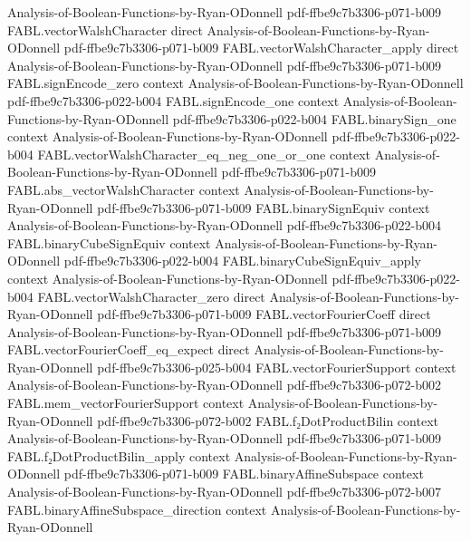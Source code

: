 \begin{theorem}
  {Analysis-of-Boolean-Functions-by-Ryan-ODonnell}
  {pdf-ffbe9c7b3306-p071-b009}
\proofstep
  {FABL.vectorWalshCharacter}
  {direct}
  {Analysis-of-Boolean-Functions-by-Ryan-ODonnell}
  {pdf-ffbe9c7b3306-p071-b009}
\proofstep
  {FABL.vectorWalshCharacter_apply}
  {direct}
  {Analysis-of-Boolean-Functions-by-Ryan-ODonnell}
  {pdf-ffbe9c7b3306-p071-b009}
\proofstep
  {FABL.signEncode_zero}
  {context}
  {Analysis-of-Boolean-Functions-by-Ryan-ODonnell}
  {pdf-ffbe9c7b3306-p022-b004}
\proofstep
  {FABL.signEncode_one}
  {context}
  {Analysis-of-Boolean-Functions-by-Ryan-ODonnell}
  {pdf-ffbe9c7b3306-p022-b004}
\proofstep
  {FABL.binarySign_one}
  {context}
  {Analysis-of-Boolean-Functions-by-Ryan-ODonnell}
  {pdf-ffbe9c7b3306-p022-b004}
\proofstep
  {FABL.vectorWalshCharacter_eq_neg_one_or_one}
  {context}
  {Analysis-of-Boolean-Functions-by-Ryan-ODonnell}
  {pdf-ffbe9c7b3306-p071-b009}
\proofstep
  {FABL.abs_vectorWalshCharacter}
  {context}
  {Analysis-of-Boolean-Functions-by-Ryan-ODonnell}
  {pdf-ffbe9c7b3306-p071-b009}
\proofstep
  {FABL.binarySignEquiv}
  {context}
  {Analysis-of-Boolean-Functions-by-Ryan-ODonnell}
  {pdf-ffbe9c7b3306-p022-b004}
\proofstep
  {FABL.binaryCubeSignEquiv}
  {context}
  {Analysis-of-Boolean-Functions-by-Ryan-ODonnell}
  {pdf-ffbe9c7b3306-p022-b004}
\proofstep
  {FABL.binaryCubeSignEquiv_apply}
  {context}
  {Analysis-of-Boolean-Functions-by-Ryan-ODonnell}
  {pdf-ffbe9c7b3306-p022-b004}
\proofstep
  {FABL.vectorWalshCharacter_zero}
  {direct}
  {Analysis-of-Boolean-Functions-by-Ryan-ODonnell}
  {pdf-ffbe9c7b3306-p071-b009}
\proofstep
  {FABL.vectorFourierCoeff}
  {direct}
  {Analysis-of-Boolean-Functions-by-Ryan-ODonnell}
  {pdf-ffbe9c7b3306-p071-b009}
\proofstep
  {FABL.vectorFourierCoeff_eq_expect}
  {direct}
  {Analysis-of-Boolean-Functions-by-Ryan-ODonnell}
  {pdf-ffbe9c7b3306-p025-b004}
\proofstep
  {FABL.vectorFourierSupport}
  {context}
  {Analysis-of-Boolean-Functions-by-Ryan-ODonnell}
  {pdf-ffbe9c7b3306-p072-b002}
\proofstep
  {FABL.mem_vectorFourierSupport}
  {context}
  {Analysis-of-Boolean-Functions-by-Ryan-ODonnell}
  {pdf-ffbe9c7b3306-p072-b002}
\proofstep
  {FABL.f₂DotProductBilin}
  {context}
  {Analysis-of-Boolean-Functions-by-Ryan-ODonnell}
  {pdf-ffbe9c7b3306-p071-b009}
\proofstep
  {FABL.f₂DotProductBilin_apply}
  {context}
  {Analysis-of-Boolean-Functions-by-Ryan-ODonnell}
  {pdf-ffbe9c7b3306-p071-b009}
\proofstep
  {FABL.binaryAffineSubspace}
  {context}
  {Analysis-of-Boolean-Functions-by-Ryan-ODonnell}
  {pdf-ffbe9c7b3306-p072-b007}
\proofstep
  {FABL.binaryAffineSubspace_direction}
  {context}
  {Analysis-of-Boolean-Functions-by-Ryan-ODonnell}

\end{theorem}

